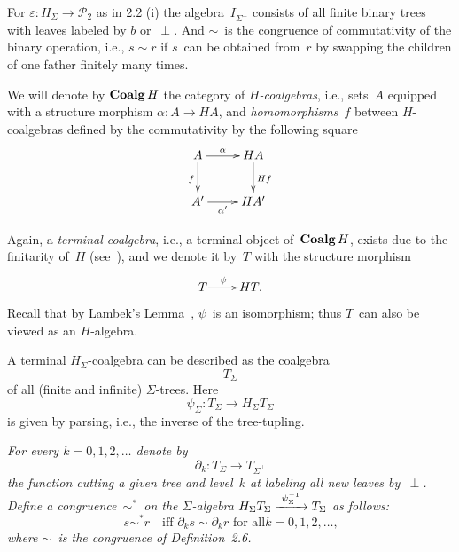 \documentclass{entcs}
\newcommand{\sims}{\ensuremath{\mathrel{\sim^*}}}
\newcommand{\PP}{\ensuremath{\mathscr{P}}}
\DeclareMathOperator{\Coalg}{\textnormal{\textbf{Coalg}}}
\newenvironment{pv}[1]{\begin{trivlist}
\item[\hspace{\labelsep}\normalfont\bfseries#1]}%
{\end{trivlist}}
\begin{document}
\begin{pv}{2.7 Example}
For $\varepsilon\colon H_\Sigma\to\PP_{\!2}$ as in 2.2 (i) the
algebra~$I_{\Sigma^\perp}$ consists of all finite binary trees with
leaves labeled by $b$ or~$\perp$. And $\sim$~is the congruence of
commutativity of the binary operation, i.e., $s\sim r$ if $s$~can be
obtained from~$r$ by swapping the children of one father finitely
many times.
\end{pv}

\begin{pv}{2.8 Notation}
We will denote by
$\Coalg H$ the category of \textit{$H$-coalgebras}, i.e.,
sets~$A$
equipped with a structure morphism $\alpha\colon A\to HA$,
and \textit{homomorphisms}~$f$ between $H$-coalgebras defined by the
commutativity by the following square\vspace{1mm}
\[
\xy
\xymatrix{
A
\ar[0,1]^-{\alpha}
\ar[1,0]_{f}
&
HA
\ar[1,0]^{Hf}
\\
A'
\ar[0,1]_-{\alpha'}
&
HA'
}
\endxy
\]
\vspace{.1mm}

\noindent
Again, a \textit{terminal coalgebra}, i.e., a terminal object
of~$\Coalg H$, exists due to the finitarity of~$H$ (see~\cite{b}), and
we denote it by~$T$ with the structure morphism
\vspace{1mm}
\[
\xy
\xymatrix@1{
T
\ar[0,1]^-{\psi}
&
HT.
}
\endxy
\]
Recall that by Lambek's Lemma~\cite{l}, $\psi$~is an isomorphism;
thus $T$~can also be viewed as an $H$-algebra.
\end{pv}

\begin{pv}{Example}
A terminal $H_\Sigma$-coalgebra can be described as the coalgebra
\[T_\Sigma\]
of all (finite and infinite) $\Sigma$-trees. Here
\[\psi_\Sigma\colon T_\Sigma\to H_\Sigma T_\Sigma\]
is given by parsing, i.e., the inverse of the tree-tupling.
\end{pv}

\begin{pv}{2.9 Definition}
\itshape
For every $k=0,1,2,\dots$ denote by
\[\partial_k\colon T_\Sigma\to T_{\Sigma^\perp}\]
the function cutting a given tree and level~$k$ at labeling all new
leaves by~$\perp$. Define a congruence~\sims\ on the
$\Sigma$-algebra $H_\Sigma T_\Sigma
\xrightarrow{\rule{1mm}{0mm}\psi_\Sigma^{-1}\rule{1mm}{0mm}}
T_\Sigma$ as follows:
\[s\sims r\quad\text{iff $\partial_ks\sim\partial_kr$ for all
$k=0,1,2,\dotsc$,}\]
where $\sim$~is the congruence of Definition~2.6.
\end{pv}
\end{document}
